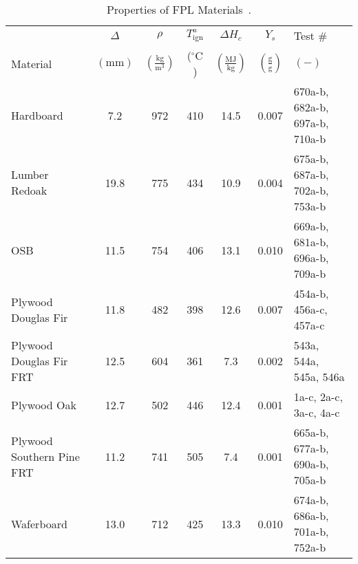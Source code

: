 \begin{table}[!h]
\caption[Properties of FPL Materials]{Properties of FPL Materials~\cite{FPL:Fire_Database}.}
\centering
\begin{tabular}{|p{4.5cm}|c|c|c|c|c|l|}
\hline
            & \centering$\Delta$& \centering$\rho$& \centering$T_{\mathrm{ign}}^{a}$&\centering$\Delta H_{c}$&\centering$Y_{s}$ & Test \# \\
Material    & \centering$\mathrm{\left(mm\right)}$ & \centering$\mathrm{\left(\frac{kg}{m^{3}}\right)}$ &  \centering($\mathrm{^{\circ}C}$)   & \centering$\left(\mathrm{\frac{MJ}{kg}}\right)$ & \centering$\mathrm{\left(\frac{g}{g}\right)}$ & $\mathrm{( - )}$  \\ \hline
\hline
Hardboard                                         & 7.2  & 972 & 410 & 14.5 & 0.007 & 670a-b, 682a-b, 697a-b, 710a-b \\\hline
Lumber Redoak                                     & 19.8 & 775 & 434 & 10.9 & 0.004 & 675a-b, 687a-b, 702a-b, 753a-b \\\hline
OSB                                               & 11.5 & 754 & 406 & 13.1 & 0.010 & 669a-b, 681a-b, 696a-b, 709a-b \\\hline
Plywood Douglas Fir                               & 11.8 & 482 & 398 & 12.6 & 0.007 & 454a-b, 456a-c, 457a-c \\\hline
Plywood Douglas Fir FRT                           & 12.5 & 604 & 361 & 7.3  & 0.002 & 543a, 544a, 545a, 546a \\\hline
Plywood Oak                                       & 12.7 & 502 & 446 & 12.4 & 0.001 & 1a-c, 2a-c, 3a-c, 4a-c \\\hline
Plywood Southern Pine FRT                         & 11.2 & 741 & 505 & 7.4  & 0.001 & 665a-b, 677a-b, 690a-b, 705a-b \\\hline
Waferboard                                        & 13.0 & 712 & 425 & 13.3 & 0.010 & 674a-b, 686a-b, 701a-b, 752a-b \\\hline
\end{tabular}
\label{Properties_FPL_Materials_All}
\end{table}
\vspace{-0.4cm}
\\


